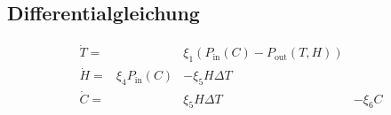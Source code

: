 \begin{refsection}
%
%
%
%
%
%
%
%
%
%

\subsection{Differentialgleichung}

\begin{equation}
\begin{matrix}
\dot{T} = &  & \xi_1 \left(P_{\text{in}}(C) - P_{\text{out}}(T, H) \right) &\\
\dot{H} = & \xi_4 P_{\text{in}}(C) & - \xi_5 H \Delta T & \\
\dot{C} = &                 &   \xi_5 H \Delta T & - \xi_6 C
\end{matrix}
\end{equation}


\end{refsection}
